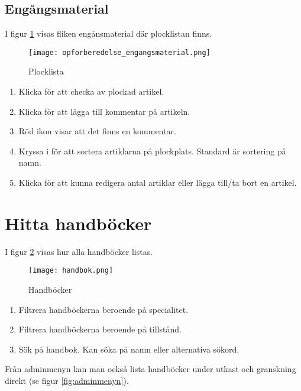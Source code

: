 \documentclass[12pt]{amsart}
\begin{document}
\subsection{Engångsmaterial}
I figur \ref{fig:opforberedelse_engangsmaterial} visas fliken engånsmaterial där plocklistan finns.

\begin{figure}[H]
	\begin{center}
	\texttt{[image: opforberedelse\_engangsmaterial.png]}
	\caption{Plocklista}
	\label{fig:opforberedelse_engangsmaterial}
	\end{center}
\end{figure}

\begin{enumerate}
\item Klicka för att checka av plockad artikel.
\item Klicka för att lägga till kommentar på artikeln.
\item Röd ikon visar att det finns en kommentar.
\item Kryssa i för att sortera artiklarna på plockplats. Standard är sortering på namn.
\item Klicka för att kunna redigera antal artiklar eller lägga till/ta bort en artikel.
\end{enumerate}

\section{Hitta handböcker}
I figur \ref{fig:handbok} visas hur alla handböcker listas.

\begin{figure}[H]
	\begin{center}
	\texttt{[image: handbok.png]}
	\caption{Handböcker}
	\label{fig:handbok}
	\end{center}
\end{figure}

\begin{enumerate}
\item Filtrera handböckerna beroende på specialitet.
\item Filtrera handböckerna beroende på tillstånd.
\item Sök på handbok. Kan söka på namn eller alternativa sökord.
\end{enumerate}

Från adminmenyn kan man också lista handböcker under utkast och granskning direkt (se figur \ref{fig:adminmenyn}).
\end{document}
